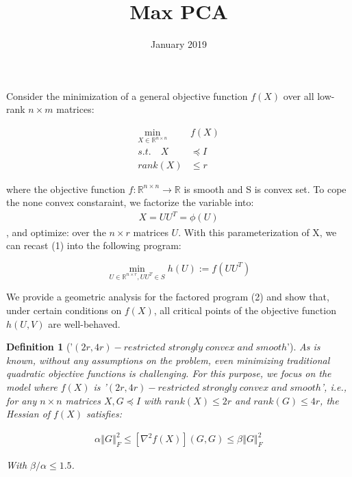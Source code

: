 \documentclass{article}
\title{Max PCA}
\date{January 2019}
\newtheorem{definition}{Definition}
\begin{document}
\maketitle

Consider the minimization of a general objective function
$f(X)$ over all low-rank $n\times m$ matrices:

\begin{equation}
\begin{split}
\min_{X\in \mathbb{R}^{n\times n}} & f\left(X\right)\\
s.t.\quad X & \preceq I\\
rank\left(X\right) &\le r
\end{split}
\end{equation}

where the objective function $f:\mathbb{R}^{n\times n} \rightarrow \mathbb{R}$ is smooth and S is convex set.
To cope the none convex constaraint, we factorize the variable into:
\begin{align*}
    X = UU^T=\phi\left(U\right)
\end{align*}, and optimize: over the $n \times r$ matrices $U$. With this parameterization of X, we can recast (1) into the following program:

\begin{equation}
    \min_{U\in \mathbb{R}^{n\times r}, UU^T\in S} h\left(U\right):=f\left(UU^T\right)
\end{equation}

We provide a geometric analysis for the factored program (2) and show that, under certain conditions on $f(X)$, all critical points of the objective function $h\left(U,V\right)$ are well-behaved.

\begin{definition}['$(2r, 4r)-restricted\; strongly\; convex\; and\; smooth$']
As is known, without any assumptions on the problem, even minimizing traditional quadratic objective functions is challenging. For this purpose, we focus on the model where $f(X)$ is '$(2r, 4r)-restricted\; strongly\; convex\; and\; smooth$', i.e., for any $n\times n$ matrices $X, G\preceq I$ with $rank(X) \le 2r$ and $rank(G) \le 4r$, the Hessian of $f(X)$ satisfies:

\begin{align}
\alpha\left\Vert G\right\Vert^2_F\le \left[\nabla^2f\left(X\right)\right]\left(G,G\right)\le \beta\left\Vert G\right\Vert^2_F
\end{align}

With $\beta / \alpha \le 1.5$.
\end{definition}
\end{document}
